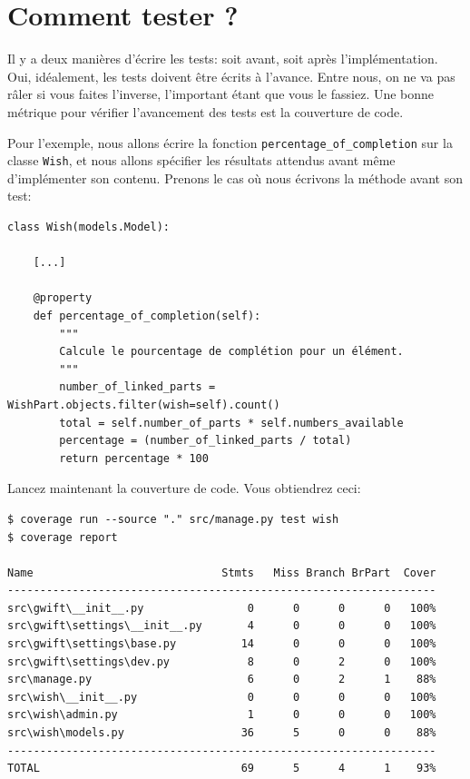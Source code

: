 \documentclass[11pt]{amsbook}
\begin{document}
\hypertarget{x-comment-tester-?}{\section{Comment tester ?}}
Il y a deux manières d’écrire les tests: soit avant, soit après l’implémentation. Oui, idéalement, les tests doivent être écrits à l’avance. Entre nous, on ne va pas râler si vous faites l’inverse, l’important étant que vous le fassiez. Une bonne métrique pour vérifier l’avancement des tests est la couverture de code.


Pour l’exemple, nous allons écrire la fonction \texttt{percentage\_of\_completion} sur la classe \texttt{Wish}, et nous allons spécifier les résultats attendus avant même d’implémenter son contenu. Prenons le cas où nous écrivons la méthode avant son test:


\begin{verbatim}
class Wish(models.Model):

    [...]

    @property
    def percentage_of_completion(self):
        """
        Calcule le pourcentage de complétion pour un élément.
        """
        number_of_linked_parts = WishPart.objects.filter(wish=self).count()
        total = self.number_of_parts * self.numbers_available
        percentage = (number_of_linked_parts / total)
        return percentage * 100
\end{verbatim}

Lancez maintenant la couverture de code. Vous obtiendrez ceci:


\begin{verbatim}
$ coverage run --source "." src/manage.py test wish
$ coverage report

Name                             Stmts   Miss Branch BrPart  Cover
------------------------------------------------------------------
src\gwift\__init__.py                0      0      0      0   100%
src\gwift\settings\__init__.py       4      0      0      0   100%
src\gwift\settings\base.py          14      0      0      0   100%
src\gwift\settings\dev.py            8      0      2      0   100%
src\manage.py                        6      0      2      1    88%
src\wish\__init__.py                 0      0      0      0   100%
src\wish\admin.py                    1      0      0      0   100%
src\wish\models.py                  36      5      0      0    88%
------------------------------------------------------------------
TOTAL                               69      5      4      1    93%
\end{verbatim}
\end{document}
